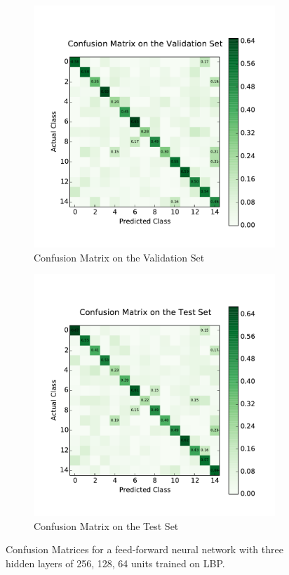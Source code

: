 \begin{figure}[H]
	\centering
	\begin{subfigure}[b]{0.45\linewidth}
		\centering
		\includegraphics[width=\linewidth]{images/2/cm_valid.pdf}
		\caption{Confusion Matrix on the Validation Set}
	\end{subfigure}
	\hfill
	\begin{subfigure}[b]{0.45\linewidth}
		\centering
		\includegraphics[width=\linewidth]{images/2/cm_test.pdf}
		\caption{Confusion Matrix on the Test Set}
	\end{subfigure}
	\caption{Confusion Matrices for a feed-forward neural network with three hidden layers of 256, 128, 64 units trained on LBP.}
	\label{shrine2_mat}
\end{figure}
